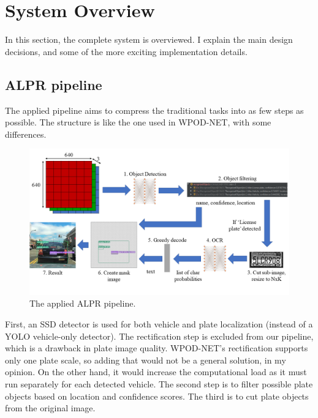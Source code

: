 \chapter{System Overview}

In this section, the complete system is overviewed. I explain the main design decisions, and some of the more exciting implementation details.

\section{ALPR pipeline}

The applied pipeline aims to compress the traditional tasks into as few steps as possible. The structure is like the one used in WPOD-NET\cite{WPOD-NET}, with some differences.

\begin{figure}[htb]
 \centerline{\includegraphics[width=1.0\columnwidth]{.//Figure/System/pipeline.PNG}}
 \caption{The applied ALPR pipeline.}
 \label{fig:simple}
\end{figure}

First, an SSD\cite{SSD} detector is used for both vehicle and plate localization (instead of a YOLO\cite{YOLO9000} vehicle-only detector). The rectification step is excluded from our pipeline, which is a drawback in plate image quality. WPOD-NET's rectification supports only one plate scale, so adding that would not be a general solution, in my opinion. On the other hand, it would increase the computational load as it must run separately for each detected vehicle. The second step is to filter possible plate objects based on location and confidence scores. The third is to cut plate objects from the original image.

